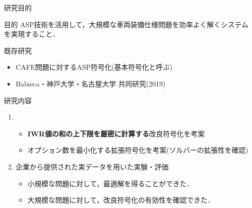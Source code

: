 \documentclass[dvipdfmx, 11pt]{beamer}
\begin{document}
\begin{frame}{研究目的}
 \begin{alertblock}{目的}
  ASP技術を活用して，大規模な車両装備仕様問題を効率よく解くシステム
  を実現すること．
 \end{alertblock}
 \begin{block}{既存研究}
  \begin{itemize}
   \item CAFE問題に対するASP符号化(基本符号化と呼ぶ)
   \item Babieca・神戸大学・名古屋大学 共同研究(2019)
  \end{itemize}
 \end{block}
 \begin{block}{研究内容}
  \begin{enumerate}
   \item {}
	 \begin{itemize}
	  \item \alert{\bf IWR値の和の上下限を厳密に計算する}改良符号化を考案
	  \item オプション数を最小化する拡張符号化を考案(ソルバーの拡張性を確認)
	 \end{itemize}
   \item 企業から提供された実データを用いた実験・評価
	 \begin{itemize}
	  \item 小規模な問題に対して，最適解を得ることができた．
	  \item 大規模な問題に対して，改良符号化の有効性を確認できた．
	 \end{itemize}
  \end{enumerate}
 \end{block}
\end{frame}
\end{document}
